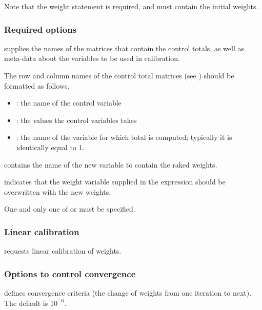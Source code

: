 \hangpara
Note that the weight statement \stcmd{[pw=\varname]} is required, and must contain the initial weights.

\subsubsection{Required options}

\hangpara
{} \RB\stcmd{)}
supplies the names of the matrices that contain the control
totals, as well as meta-data about the variables to be used
in calibration.

\begin{sttech}
The row and column names of the control total matrices
(see ) should be formatted as follows.
\begin{itemize}
    \item {}: the name of the control variable
    \item {}: the values the control variables takes
    \item {}: the name of the variable for which total is computed;
          typically it is identically equal to 1.
\end{itemize}
\end{sttech}

\hangpara
{}
contains the name of the new variable to contain the raked weights.

\hangpara
{} indicates that the weight variable supplied in the
\stcmd{[pw=\varname]} expression should be overwritten with the new weights.

One and only one of  or  must be specified.

\subsubsection{Linear calibration}

\hangpara
{}
requests linear calibration of weights.

\subsubsection{Options to control convergence}

\hangpara
{} defines convergence criteria
(the change of weights from one iteration to next). The default is $10^{-6}$.

